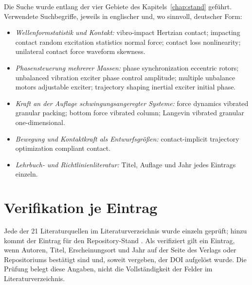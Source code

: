 \documentclass[12pt,a4paper]{report}
\begin{document}
Die Suche wurde entlang der vier Gebiete des Kapitels~\ref{chap:stand}
geführt. Verwendete Suchbegriffe, jeweils in englischer und, wo
sinnvoll, deutscher Form:

\begin{itemize}
\item \emph{Wellenformstatistik und Kontakt:} vibro-impact Hertzian
      contact; impacting contact random excitation statistics normal
      force; contact loss nonlinearity; unilateral contact force
      waveform skewness.
\item \emph{Phasensteuerung mehrerer Massen:} phase synchronization
      eccentric rotors; unbalanced vibration exciter phase control
      amplitude; multiple unbalance motors adjustable exciter; trajectory
      shaping inertial exciter initial phase.
\item \emph{Kraft an der Auflage schwingungsangeregter Systeme:} force
      dynamics vibrated granular packing; bottom force vibrated column;
      Langevin vibrated granular one-dimensional.
\item \emph{Bewegung und Kontaktkraft als Entwurfsgrößen:}
      contact-implicit trajectory optimization compliant contact.
\item \emph{Lehrbuch- und Richtlinienliteratur:} Titel, Auflage und
      Jahr jedes Eintrags einzeln.
\end{itemize}

\section{Verifikation je Eintrag}

Jede der 21 Literaturquellen im Literaturverzeichnis wurde einzeln
geprüft; hinzu kommt der Eintrag für den Repository-Stand
\cite{frueh2026repo}. Als verifiziert gilt ein Eintrag, wenn Autoren,
Titel, Erscheinungsort und Jahr auf der Seite des Verlags oder
Repositoriums bestätigt sind und, soweit vergeben, der DOI aufgelöst
wurde. Die Prüfung belegt diese Angaben, nicht die Vollständigkeit der
Felder im Literaturverzeichnis.
\end{document}
